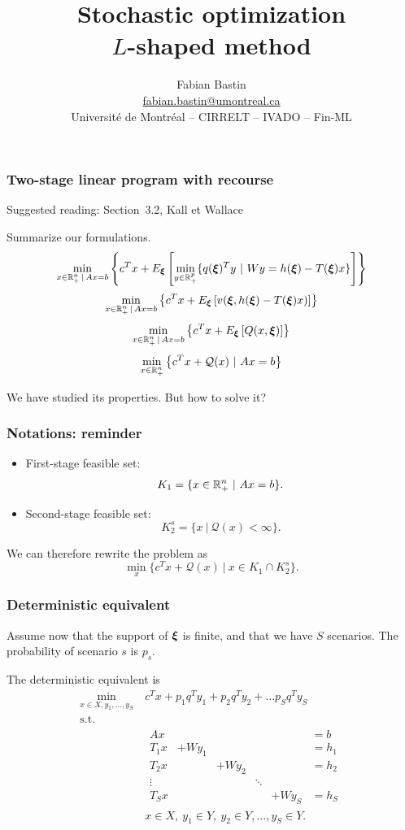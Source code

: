 \documentclass{beamer}
\author[Fabian Bastin]{Fabian Bastin \\ \url{fabian.bastin@umontreal.ca} \\ Université de Montréal -- CIRRELT -- IVADO -- Fin-ML}
\date{}
\title[$L$-shaped method]{Stochastic optimization\\$L$-shaped method}
\begin{document}
\frame{\titlepage}

\begin{frame}
\frametitle{Two-stage linear program with recourse}

{\red Suggested reading: Section~3.2, Kall et Wallace}

\mbox{}

Summarize our formulations.
\[
\min_{x \in {\mathbb{R}}^n_+ \,|\, Ax = b} \left\lbrace c^Tx + E_{{\boldsymbol{\xi}}} \left[ \min_{y \in {\mathbb{R}}^p_+} \lbrace q({\boldsymbol{\xi}})^Ty \ |\ Wy = h({\boldsymbol{\xi}}) - T({\boldsymbol{\xi}})x \rbrace \right] \right\rbrace 
\]
\[
\min_{x \in {\mathbb{R}}^n_+ \,|\, Ax = b} \left\lbrace c^Tx + E_{{\boldsymbol{\xi}}}
  \left[  v({\boldsymbol{\xi}}, h({\boldsymbol{\xi}})-T({\boldsymbol{\xi}})x) \right] \right\rbrace 
\]
\[
\min_{x \in {\mathbb{R}}^n_+ \,|\, Ax = b} \left\lbrace c^Tx + E_{{\boldsymbol{\xi}}} \left[ Q(x,{\boldsymbol{\xi}}) \right] \right\rbrace 
\]
\[
\min_{x \in {\mathbb{R}}^n_+} \left\lbrace c^Tx + \mathcal{Q}(x)
  \ |\ Ax = b \right\rbrace 
\]

We have studied its properties. But how to solve it?

\end{frame}

\begin{frame}
\frametitle{Notations: reminder}

\begin{itemize}
\item
First-stage feasible set:
\[
K_1 = \lbrace x \in {\mathbb{R}}^n_+ \ |\ Ax = b \rbrace.
\]
\item
Second-stage feasible set:
\[
K_2^s = \lbrace x \ |\ \mathcal{Q}(x) < \infty \rbrace.
\]
\end{itemize}
We can therefore rewrite the problem as
\[
\min_x \lbrace c^Tx + \mathcal{Q}(x) \ |\ x \in K_1 \cap K_2^s \rbrace.
\]



\end{frame}

\begin{frame}
\frametitle{Deterministic equivalent}

Assume now that the support of ${\boldsymbol{\xi}}$ is finite, and that we have $S$ scenarios.
The probability of scenario $s$ is $p_s$.

\mbox{}

The deterministic equivalent is
\begin{align*}
\min_{x \in X, y_1, \ldots, y_S}\ & c^T x + p_1 q^T y_1 + p_2 q^T y_2 + \ldots
p_S q^Ty_S \\
\mbox{s.t. } & \\
& \begin{matrix} Ax & & & & & = b\\
T_1 x & + W y_1 & & & & = h_1 \\
T_2 x & & + W y_2 & & & = h_2 \\
\vdots & & & \ddots & \\
T_S x & & & & + W y_S & = h_S
\end{matrix} \\
& x \in X,\ y_1 \in Y,\ y_2 \in Y,\ldots, y_S \in Y.
\end{align*}

\end{frame}
\end{document}
